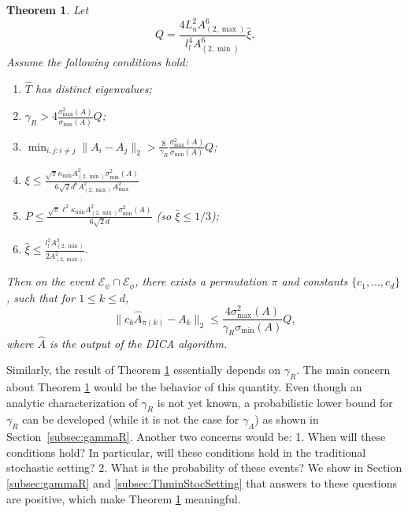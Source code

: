 \documentclass[twoside]{article}
\newcommand{\Epsi}{\mathcal{E}_{\psi}}
\newcommand{\Ephi}{\mathcal{E}_{\phi}}
\newtheorem{thm}[lemma]{Theorem}
\theoremstyle{definition}
\begin{document}
\begin{thm}
\label{thm:Modefficiency}
Let 
 \[ 
 Q=  
 \frac{4L_u^2A^6_{(2,\max)}}{l_l^4 A^6_{(2,\min)}}\widehat{\xi}.
 \] 
 Assume the following conditions hold:
 \begin{enumerate}
 \vspace{-3mm}
 \item $\widehat{T}$ has distinct eigenvalues;
 \item $\gamma_R > 4 \frac{\sigma_{\max}^2(A)}{\sigma_{\min}(A) }Q$; 
 \item $\min_{i,j:i\neq j} \|A_i - A_j\|_2 > \frac{8}{\gamma_R}\frac{\sigma_{\max}^2(A)}{\sigma_{\min}(A) } Q$;
 \item $\xi \le \frac{\sqrt{\pi}\kappa_{\min}A^2_{(2,\min)}\sigma_{\min}^2(A)}{6\sqrt{2}d^6A_{(2,\max)}^2A_{\max}^2}$
 \item $P \le \frac{\sqrt{\pi}\ell^2\kappa_{\min}A^2_{(2,\min)}\sigma_{\min}^2(A)}{6\sqrt{2}d}$
 (so $\bar{\xi} \le 1/3$);
 \item $\widehat{\xi} \le \frac{l_l^2 A^2_{(2,\min)}}{2A^2_{(2,\max)}}$.
 \end{enumerate}
 \vspace{-2mm}
Then on the event $\Epsi \cap\Ephi$, there exists a permutation $\pi$ and constants $\{c_1,\ldots,c_d\}$, such that for $1\le k\le d$,
\[
\| c_k\widehat{A}_{\pi(k)} - A_k\|_2 \le \frac{4\sigma^2_{\max}(A)}{\gamma_R\sigma_{\min}(A)} Q,
\]
where $\widehat{A}$ is the output of the DICA algorithm.
\end{thm}

Similarly, the result of Theorem \ref{thm:Modefficiency} essentially depends on $\gamma_R$. 
The main concern about Theorem \ref{thm:Modefficiency} would be the behavior of this quantity. 
Even though an analytic characterization of $\gamma_R$ is not yet known, a probabilistic lower bound for $\gamma_R$ can be developed (while it is not the case for $\gamma_A$) as shown in Section~\ref{subsec:gammaR}.
Another two concerns would be: 1. When will these conditions hold? In particular, will these conditions hold in the traditional stochastic setting? 2. What is the probability of these events?
We show in Section \ref{subsec:gammaR} and \ref{subsec:ThminStocSetting} that answers to these questions are positive, which make Theorem \ref{thm:Modefficiency} meaningful.
\end{document}
